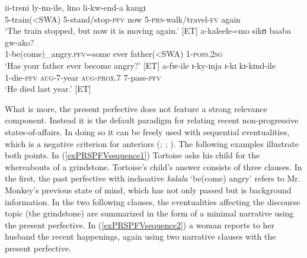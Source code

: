 \begin{exe}
\ex \label{exInchoativeChangeOfStateOver}\gll ii-treni ly-ɪm-ile, lɪno li-kw-end-a kangɪ\\
5-train(<SWA) 5-stand/stop-\textsc{pfv} now 5-\textsc{prs}-walk/travel-\textsc{fv} again\\
\glt \lq The train stopped, but now it is moving again.' [ET]
\ex \label{exInchoativeChangeOfStateExistential} \gll a-kaleele=mo sikʊ baaba gw-ako?\\ 1-be(come)\_angry.\textsc{pfv}=some ever father(<SWA) 1-\textsc{poss.2sg}\\\glt `Has your father ever become angry?' [ET] %
\ex \label{exInchoativeChangeOfStateTemporalAdverb} \gll a-fw-ile ɪ-ky-ɪnja ɪ-kɪ kɪ-kɪnd-ile\\
1-die-\textsc{pfv} \textsc{aug}-7-year \textsc{aug}-\textsc{prox.7} 7-pass-\textsc{pfv}\\
\glt `He died last year.' [ET]
\end{exe}

What is more, the present perfective does not feature a strong relevance component. Instead it is the default paradigm for relating recent non-progressive states-of-affairs. In doing so it can be freely used with sequential eventualities, which is a negative criterion for anteriors (\citealt[138]{DahlOe1985}; \citealt[54]{BybeePerkinsPaglucia1994}; \citealt[371]{LindstedtJ2000}). The following examples illustrate both points. In (\ref{exPRSPFVsequence1}) Tortoise asks his child for the whereabouts of a grindstone. Tortoise's child's answer consists of three clauses. In the first, the past perfective with inchoative \textit{kalala} \lq be(come) angry' refers to Mr. Monkey's previous state of mind, which has not only passed but is background information. In the two following clauses, the eventualities affecting the discourse topic (the grindstone) are summarized in the form of a minimal narrative using the present perfective. In (\ref{exPRSPFVsequence2}) a woman reports to her husband the recent happenings, again using two narrative clauses with the present perfective.

